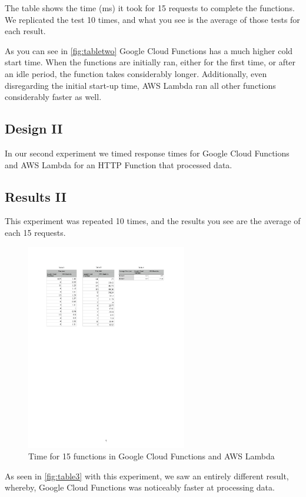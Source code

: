 \documentclass[10pt, conference]{IEEEtran}
\begin{document}
The table shows the time (ms) it took for 15 requests to complete the functions. We replicated the test 10 times, and what you see is the average of those tests for each result. 

As you can see in \autoref{fig:tabletwo} Google Cloud Functions has a much higher cold start time. When the functions are initially ran, either for the first time, or after an idle period, the function takes considerably longer. Additionally, even disregarding the initial start-up time, AWS Lambda ran all other functions considerably faster as well. 

\subsection{Design II}
In our second experiment we timed response times for Google Cloud Functions and AWS Lambda for an HTTP Function that processed data. 

\subsection{Results II}
This experiment was repeated 10 times, and the results you see are the average of each 15 requests. 

\begin{figure}[!htbp]
\centerline{\includegraphics[width=7cm]{table3.PDF}}
\caption{Time for 15 functions in Google Cloud Functions and AWS Lambda}
\label{fig:table3}
\end{figure}

As seen in \autoref{fig:table3} with this experiment, we saw an entirely different result, whereby, Google Cloud Functions was noticeably faster at processing data. 
\end{document}
